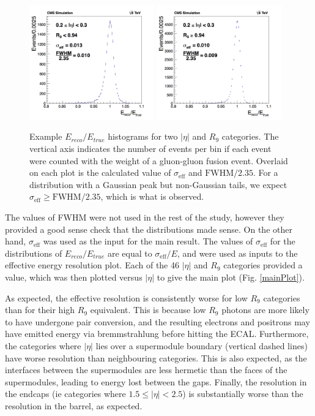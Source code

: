 \documentclass[10pt]{article}
\begin{document}
\begin{figure}[h!]

  \centering
\includegraphics[width=0.48\textwidth]{"Hist2_mva"}
\includegraphics[width=0.48\textwidth]{"Hist25_mva"}
\caption{Example $E_{reco}/E_{true} $ histograms for two $|\eta|$ and $R_{9}$ categories. The vertical axis indicates the number of events per bin if each event were counted with the weight of a gluon-gluon fusion event. Overlaid on each plot is the calculated value of  $\sigma_{\text{eff}}$ and $\text{FWHM}/2.35$. For a distribution with a Gaussian peak but non-Gaussian tails, we expect $\sigma_{\text{eff}} \geq \text{FWHM}/2.35$, which is what is observed.}
\label{EtrueEreco}
\end{figure}

The values of FWHM were not used in the rest of the study, however they provided a good sense check that the distributions made sense. On the other hand, $\sigma_{\text{eff}}$ was used as the input for the main result. The values of $\sigma_{\text{eff}}$ for the distributions of $E_{reco}/E_{true}$ are equal to $\sigma_{\text{eff}}/E$, and were used as inputs to the effective energy resolution plot. Each of the 46 $|\eta|$ and $R_{9}$ categories provided a value, which was then plotted versus $|\eta|$ to give the main plot (Fig. \ref{mainPlot}).

As expected, the effective resolution is consistently worse for low $R_{9}$ categories than for their high $R_9$ equivalent. This is because low $R_9$ photons are more likely to have undergone pair conversion, and the resulting electrons and positrons may have emitted energy via bremmstrahlung before hitting the ECAL. Furthermore, the categories where $|\eta|$ lies over a supermodule boundary (vertical dashed lines) have worse resolution than neighbouring categories. This is also expected, as the interfaces between the supermodules are less hermetic than the faces of the supermodules, leading to energy lost between the gaps. Finally, the resolution in the endcaps (ie categories where $1.5\leq |\eta| <2.5$) is substantially worse than the resolution in the barrel, as expected.
\end{document}
